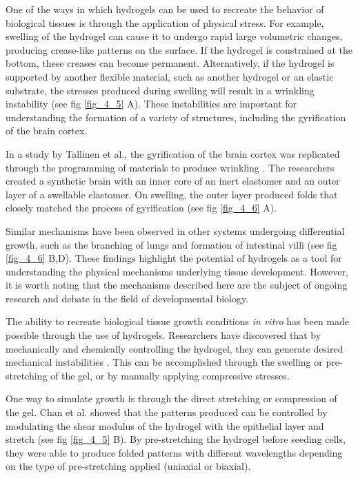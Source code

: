 One of the ways in which hydrogels can be used to recreate the behavior of biological tissues is through the application of physical stress. For example, swelling of the hydrogel can cause it to undergo rapid large volumetric changes, producing crease-like patterns on the surface. If the hydrogel is constrained at the bottom, these creases can become permanent. Alternatively, if the hydrogel is supported by another flexible material, such as another hydrogel or an elastic substrate, the stresses produced during swelling will result in a wrinkling instability (see fig \ref{fig_4_5} A). These instabilities are important for understanding the formation of a variety of structures, including the gyrification of the brain cortex.

In a study by Tallinen et al., the gyrification of the brain cortex was replicated through the programming of materials to produce wrinkling \cite{tallinen2016}. The researchers created a synthetic brain with an inner core of an inert elastomer and an outer layer of a swellable elastomer. On swelling, the outer layer produced folds that closely matched the process of gyrification (see fig \ref{fig_4_6} A).

Similar mechanisms have been observed in other systems undergoing differential growth, such as the branching of lungs and formation of intestinal villi \cite{varner2015,shyer2013} (see fig \ref{fig_4_6} B,D). These findings highlight the potential of hydrogels as a tool for understanding the physical mechanisms underlying tissue development. However, it is worth noting that the mechanisms described here are the subject of ongoing research and debate in the field of developmental biology.

The ability to recreate biological tissue growth conditions \textit{in vitro} has been made possible through the use of hydrogels. Researchers have discovered that by mechanically and chemically controlling the hydrogel, they can generate desired mechanical instabilities \cite{dervaux2012}. This can be accomplished through the swelling or pre-stretching of the gel, or by manually applying compressive stresses.

One way to simulate growth is through the direct stretching or compression of the gel. Chan et al. showed that the patterns produced can be controlled by modulating the shear modulus of the hydrogel with the epithelial layer and stretch \cite{chan2018} (see fig \ref{fig_4_5} B). By pre-stretching the hydrogel before seeding cells, they were able to produce folded patterns with different wavelengths depending on the type of pre-stretching applied (uniaxial or biaxial). 

